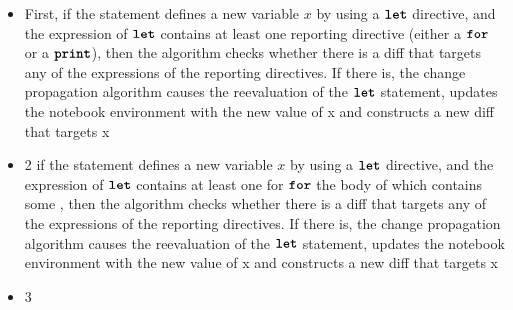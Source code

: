 \begin{itemize}
\item First, if the statement defines a new variable $x$ by using a $\texttt{\textbf{let}}$ directive, and the expression of $\texttt{\textbf{let}}$ contains at least one reporting directive (either a $\texttt{\textbf{for}}$ or a $\texttt{\textbf{print}}$), then the algorithm checks whether there is a diff that targets any of the expressions of the reporting directives. If there is, the change propagation algorithm causes the reevaluation of the $\texttt{\textbf{let}}$ statement, updates the notebook environment with the new value of x and constructs a new diff that targets x
\item 2 if the statement defines a new variable $x$ by using a $\texttt{\textbf{let}}$ directive, and the expression of $\texttt{\textbf{let}}$ contains at least one for $\texttt{\textbf{for}}$ the body of which contains some , then the algorithm checks whether there is a diff that targets any of the expressions of the reporting directives. If there is, the change propagation algorithm causes the reevaluation of the $\texttt{\textbf{let}}$ statement, updates the notebook environment with the new value of x and constructs a new diff that targets x
\item 3

\end{itemize}

